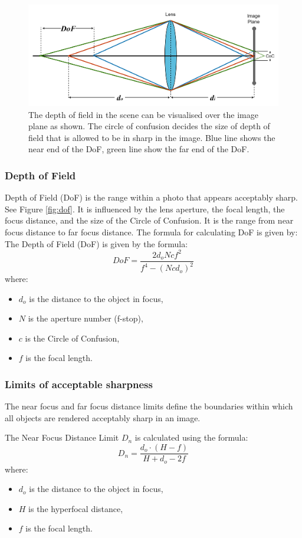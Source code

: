 \documentclass{article}
\begin{document}
\begin{figure}
\centering
\includegraphics[width=0.8\linewidth]{coc.png}
\caption{\label{fig:coc} The depth of field in the scene can be visualised over the image plane as shown. The circle of confusion decides the size of depth of field that is allowed to be in sharp in the image. Blue line shows the near end of the DoF, green line show the far end of the DoF. }
\end{figure}

 
\subsubsection{Depth of Field}
\label{sssec:dof}
Depth of Field (DoF) is the range within a photo that appears acceptably sharp. See Figure \ref{fig:dof}.  It is influenced by the lens aperture, the focal length, the focus distance, and the size of the Circle of Confusion. It is the range from near focus distance to far focus distance. The formula for calculating DoF is given by:
The Depth of Field (DoF) is given by the formula:
\[
DoF = \frac{2 d_o N c f^2}{f^4 - (N c d_o)^2}
\]
where:
\begin{itemize}
    \item \( d_o \) is the distance to the object in focus,
    \item \( N \) is the aperture number (f-stop),
    \item \( c \) is the Circle of Confusion,
    \item \( f \) is the focal length.
\end{itemize}

\subsubsection{Limits of acceptable sharpness}
\label{sec:limits}
The near focus and far focus distance limits define the boundaries within which all objects are rendered acceptably sharp in an image.

The Near Focus Distance Limit \( D_n \) is calculated using the formula:
\[
D_n = \frac{d_o \cdot (H-f)}{H + d_o -2f}
\]
where:
\begin{itemize}
    \item \( d_o \) is the distance to the object in focus,
    \item \( H \) is the hyperfocal distance,
    \item \( f \) is the focal length.
\end{itemize}
\end{document}
